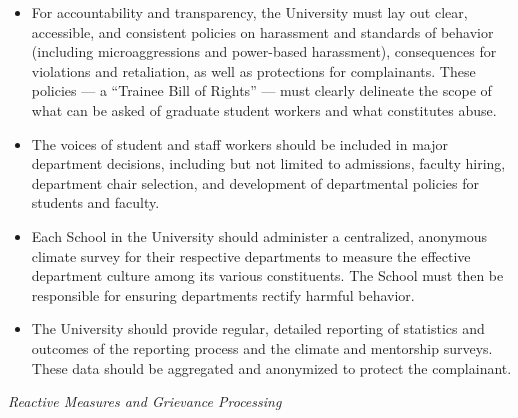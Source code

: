 \documentclass[12pt, titlepage, letterpaper]{article}
\begin{document}
\begin{itemize}
    \item For accountability and transparency, the University must lay out clear, accessible, and consistent policies on harassment and standards of behavior (including microaggressions and power-based harassment), consequences for violations and retaliation, as well as protections for complainants. These policies --- a “Trainee Bill of Rights” --- must clearly delineate the scope of what can be asked of graduate student workers and what constitutes abuse. 
    \item The voices of student and staff workers should be included in major department decisions, including but not limited to admissions, faculty hiring, department chair selection, and development of departmental policies for students and faculty. 
    \item Each School in the University should administer a centralized, anonymous climate survey for their respective departments to measure the effective department culture among its various constituents. The School must then be responsible for ensuring departments rectify harmful behavior. 
    \item The University should provide regular, detailed reporting of statistics and outcomes of the reporting process and the climate and mentorship surveys. These data should be aggregated and anonymized to protect the complainant. 

\end{itemize}

\textit{Reactive Measures and Grievance Processing}
\end{document}
